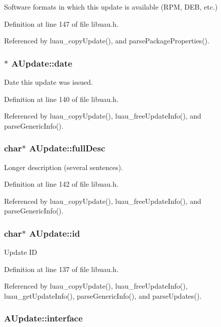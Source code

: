 Software formats in which this update is available (RPM, DEB, etc.) 

Definition at line 147 of file libuau.h.

Referenced by luau\_\-copy\-Update(), and parse\-Package\-Properties().
\subsubsection{$\ast$ {\bf AUpdate::date}}\label{structAUpdate_o3}


Date this update was issued. 

Definition at line 140 of file libuau.h.

Referenced by luau\_\-copy\-Update(), luau\_\-free\-Update\-Info(), and parse\-Generic\-Info().
\subsubsection{\setlength{\rightskip}{0pt plus 5cm}char$\ast$ {\bf AUpdate::full\-Desc}}\label{structAUpdate_o5}


Longer description (several sentences). 

Definition at line 142 of file libuau.h.

Referenced by luau\_\-copy\-Update(), luau\_\-free\-Update\-Info(), and parse\-Generic\-Info().
\subsubsection{\setlength{\rightskip}{0pt plus 5cm}char$\ast$ {\bf AUpdate::id}}\label{structAUpdate_o0}


Update ID 

Definition at line 137 of file libuau.h.

Referenced by luau\_\-copy\-Update(), luau\_\-free\-Update\-Info(), luau\_\-get\-Update\-Info(), parse\-Generic\-Info(), and parse\-Updates().
\subsubsection{ {\bf AUpdate::interface}}\label{structAUpdate_o11}


